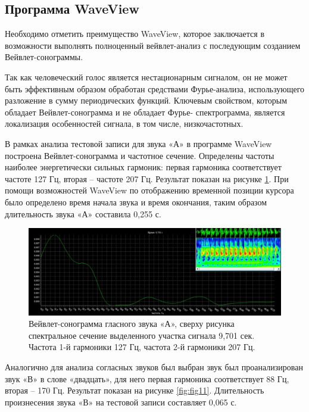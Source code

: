 \subsection*{Программа WaveView}

Необходимо отметить преимущество WaveView, которое заключается в возможности
выполнять полноценный вейвлет-анализ с последующим созданием
Вейвлет-сонограммы.

Так как человеческий голос является нестационарным сигналом, он не может быть
эффективным образом обработан средствами Фурье-анализа, использующего
разложение в сумму периодических функций. Ключевым свойством, которым обладает
Вейвлет-сонограмма и не обладает Фурье- спектрограмма, является локализация
особенностей сигнала, в том числе, низкочастотных.

В рамках анализа тестовой записи для звука «А» в программе WaveView построена
Вейвлет-сонограмма и частотное сечение. Определены частоты наиболее
энергетически сильных гармоник: первая гармоника соответствует частоте 127 Гц,
вторая – частоте 207 Гц. Результат показан на рисунке \ref{fig:fig10}.
При помощи возможностей WaveView по отображению временной позиции курсора было
определено время начала звука и время окончания, таким образом длительность
звука «А» составила 0,255 с.

\begin{figure}
    \centering
    \includegraphics[scale=0.5]{inc/fig_10.jpg}
    \caption{
        Вейвлет-сонограмма гласного звука «А», сверху рисунка спектральное
        сечение выделенного участка сигнала 9,701 сек. Частота 1-й гармоники 127
        Гц, частота 2-й гармоники 207 Гц.
    }
    \label{fig:fig10}
\end{figure}

Аналогично для анализа согласных звуков был выбран звук был проанализирован
звук «В» в слове «двадцать», для него первая гармоника соответствует 88 Гц,
вторая – 170 Гц. Результат показан на рисунке \ref{fig:fig11}. Длительность
произнесения звука «В» на тестовой записи составляет 0,065 с.

